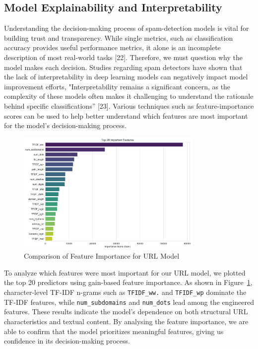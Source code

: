 \documentclass{article}
\begin{document}
\subsection{Model Explainability and Interpretability}

\noindent
Understanding the decision-making process of spam-detection models is vital for building trust and transparency. While single metrics, such as classification accuracy provides useful performance metrics, it alone is an incomplete description of most real-world tasks [22]. Therefore, we must question why the model makes each decision. Studies regarding spam detectors have shown that the lack of interpretability in deep learning models can negatively impact model improvement efforts, "Interpretability remains a significant concern, as the complexity of these models often makes it challenging to understand the rationale behind specific classifications” [23]. Various techniques such as feature-importance scores can be used to help better understand which features are most important for the model's decision-making process. 

\begin{figure}[htbp]
    \centering
    \includegraphics[width=0.8\textwidth]{../analysis/url/feature_importance.png}
    \caption{Comparison of Feature Importance for URL Model}
    \label{fig:feature_importance_1}
\end{figure}

\noindent
To analyze which features were most important for our URL model, we plotted the top 20 predictors using gain-based feature importance. As shown in Figure~\ref{fig:feature_importance_1}, character-level TF-IDF n-grams such as \texttt{TFIDF\_ww.} and \texttt{TFIDF\_wp} dominate the TF-IDF features, while \texttt{num\_subdomains} and \texttt{num\_dots} lead among the engineered features. These results indicate the model's dependence on both structural URL characteristics and textual content. By analysing the feature importance, we are able to confirm that the model prioritizes meaningful features, giving us confidence in its decision-making process.
\end{document}
